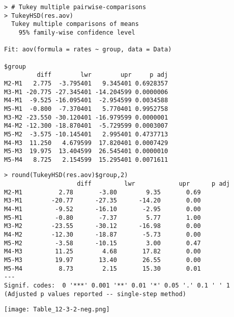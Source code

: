 \begin{frame}[fragile]
	\begin{center}
		\begin{minipage}{0.6\textwidth}
	\begin{lstlisting}
> # Tukey multiple pairwise-comparisons
> TukeyHSD(res.aov)
  Tukey multiple comparisons of means
    95% family-wise confidence level

Fit: aov(formula = rates ~ group, data = Data)

$group
         diff        lwr        upr     p adj
M2-M1   2.775  -3.795401   9.345401 0.6928357
M3-M1 -20.775 -27.345401 -14.204599 0.0000006
M4-M1  -9.525 -16.095401  -2.954599 0.0034588
M5-M1  -0.800  -7.370401   5.770401 0.9952758
M3-M2 -23.550 -30.120401 -16.979599 0.0000001
M4-M2 -12.300 -18.870401  -5.729599 0.0003007
M5-M2  -3.575 -10.145401   2.995401 0.4737713
M4-M3  11.250   4.679599  17.820401 0.0007429
M5-M3  19.975  13.404599  26.545401 0.0000010
M5-M4   8.725   2.154599  15.295401 0.0071611
	\end{lstlisting}
		\end{minipage}
	\end{center}
\end{frame}
\begin{frame}[fragile]
	\begin{center}
		\begin{minipage}{0.6\textwidth}
	\begin{lstlisting}
> round(TukeyHSD(res.aov)$group,2)
					diff   		 lwr		    upr		 p adj
M2-M1		   2.78		  -3.80		   9.35		  0.69
M3-M1		 -20.77		 -27.35		 -14.20		  0.00
M4-M1		  -9.52		 -16.10		  -2.95		  0.00
M5-M1		  -0.80		  -7.37		   5.77		  1.00
M3-M2		 -23.55		 -30.12		 -16.98		  0.00
M4-M2		 -12.30		 -18.87		  -5.73		  0.00
M5-M2		  -3.58		 -10.15		   3.00		  0.47
M4-M3		  11.25		   4.68		  17.82		  0.00
M5-M3		  19.97		  13.40		  26.55		  0.00
M5-M4		   8.73		   2.15		  15.30		  0.01
---
Signif. codes:  0 '***' 0.001 '**' 0.01 '*' 0.05 '.' 0.1 ' ' 1
(Adjusted p values reported -- single-step method)
	\end{lstlisting}
		\end{minipage}
		\texttt{[image: Table\_12-3-2-neg.png]}
	\end{center}
\end{frame}
